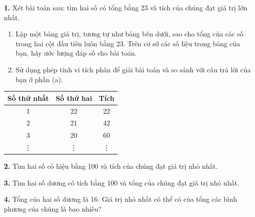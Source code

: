 \documentclass[10pt]{article}
\begin{document}
\vspace{12pt}

\noindent
\begin{minipage}[t]{0.48\textwidth}
\fontsize{9}{12.2}\selectfont

\hangindent=13pt
\textbf{1.} Xét bài toán sau: tìm hai số có tổng bằng 23 và tích của chúng đạt giá trị lớn nhất.
\begin{enumerate}[label=\textbf{(\alph*)}, leftmargin=18pt, labelsep=4pt, itemsep=2pt, parsep=0pt, topsep=2.5pt]
    \item Lập một bảng giá trị, tương tự như bảng bên dưới, sao cho tổng của các số trong hai cột đầu tiên luôn bằng 23. Trên cơ sở các số liệu trong bảng của bạn, hãy ước lượng đáp số cho bài toán.
    \item Sử dụng phép tính vi tích phân để giải bài toán và so sánh với câu trả lời của bạn ở phần (a).
\end{enumerate}

\vspace{4pt}
\begin{center}
\renewcommand{\arraystretch}{1.15}
\setlength{\tabcolsep}{9pt}
{\fontsize{8.5}{11}\selectfont
\begin{tabular}{|c|c|c|}
    \hline
    \rowcolor{stewarttableblue}
    \textsf{Số thứ nhất} & \textsf{Số thứ hai} & \textsf{Tích} \\
    \hline
    1 & 22 & 22 \\
    2 & 21 & 42 \\
    3 & 20 & 60 \\
    \vdots & \vdots & \vdots \\
    \hline
\end{tabular}}
\end{center}
\vspace{5pt}

\hangindent=13pt
\textbf{2.} Tìm hai số có hiệu bằng 100 và tích của chúng đạt giá trị nhỏ nhất.

\vspace{6pt}
\hangindent=13pt
\textbf{3.} Tìm hai số dương có tích bằng 100 và tổng của chúng đạt giá trị nhỏ nhất.

\vspace{6pt}
\hangindent=13pt
\textbf{4.} Tổng của hai số dương là 16. Giá trị nhỏ nhất có thể có của tổng các bình phương của chúng là bao nhiêu?


\end{minipage}
\end{document}
